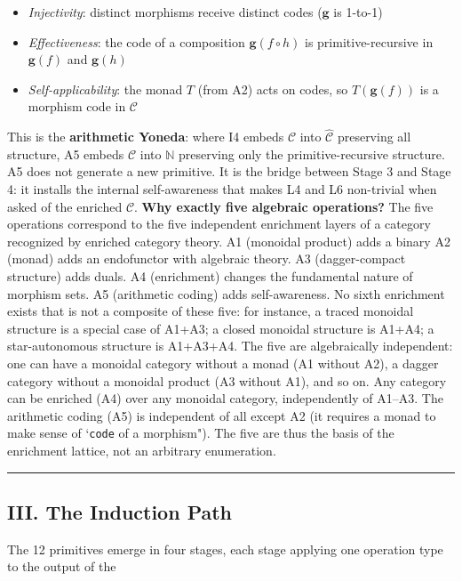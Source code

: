 \documentclass[12pt,a4paper]{article}
\begin{document}
\begin{itemize}
 \item \emph{Injectivity}: distinct morphisms receive distinct codes ($\mathbf{g}$ is 1-to-1)
 \item \emph{Effectiveness}: the code of a composition $\mathbf{g}(f \circ h)$ is primitive-recursive in
$\mathbf{g}(f)$ and $\mathbf{g}(h)$
 \item \emph{Self-applicability}: the monad $T$ (from A2) acts on codes, so $T(\mathbf{g}(f))$ is a morphism code in
$\mathcal{C}$
\end{itemize}

This is the \textbf{arithmetic Yoneda}: where I4 embeds $\mathcal{C}$ into $\hat{\mathcal{C}}$ preserving all
structure, A5 embeds $\mathcal{C}$ into $\mathbb{N}$ preserving only the primitive-recursive structure. A5 does not
generate a new primitive. It is the bridge between Stage 3 and Stage 4: it installs the internal self-awareness that
makes L4 and L6 non-trivial when asked of the enriched $\mathcal{C}$.
\textbf{Why exactly five algebraic operations?} The five operations correspond to the five independent enrichment
layers of a category recognized by enriched category theory. A1 (monoidal product) adds a binary
A2 (monad) adds an endofunctor with algebraic theory. A3 (dagger-compact structure) adds duals. A4
(enrichment) changes
the fundamental nature of morphism sets. A5 (arithmetic coding) adds self-awareness. No sixth enrichment exists that is
not a composite of these five: for instance, a traced monoidal structure is a special case of A1+A3; a closed monoidal
structure is A1+A4; a star-autonomous structure is A1+A3+A4. The five are algebraically independent: one can have a
monoidal category without a monad (A1 without A2), a dagger category without a monoidal product (A3 without A1), and so
on. Any category can be enriched (A4) over any monoidal category, independently of A1--A3. The arithmetic coding (A5)
is independent of all except A2 (it requires a monad to make sense of `\texttt{code} of a morphism"). The five are thus the
basis of the enrichment lattice, not an arbitrary enumeration.

\begin{center}
\rule{0.5\textwidth}{0.4pt}
\end{center}


\subsection{III. The Induction Path}
The 12 primitives emerge in four stages, each stage applying one operation type to the output of the
\end{document}
